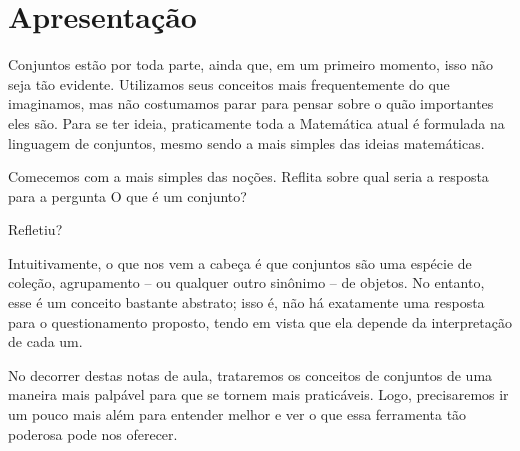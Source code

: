 \section{Apresentação}

Conjuntos estão por toda parte, ainda que, em um primeiro momento, isso não seja tão evidente. Utilizamos seus conceitos mais frequentemente do que imaginamos, mas não costumamos parar para pensar sobre o quão importantes eles são.
Para se ter ideia, praticamente toda a Matemática atual é formulada na linguagem de conjuntos, mesmo sendo a mais simples das ideias matemáticas.

Comecemos com a mais simples das noções. Reflita sobre qual seria a resposta para a pergunta \abreaspas O que é um conjunto?\fechaaspas

\reticencias Refletiu?

Intuitivamente, o que nos vem a cabeça é que conjuntos são uma espécie de coleção, agrupamento -- ou qualquer outro sinônimo -- de objetos.
No entanto, esse é um conceito bastante abstrato; isso é, não há exatamente uma resposta para o questionamento proposto, tendo em vista que ela depende da interpretação de cada um.

No decorrer destas notas de aula, trataremos os conceitos de conjuntos de uma maneira mais palpável para que se tornem mais praticáveis.
Logo, precisaremos ir um pouco mais além para entender melhor e ver o que essa ferramenta tão poderosa pode nos oferecer.
